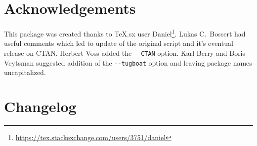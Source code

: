 \documentclass{ltxdoc}
\begin{document}
\section{Acknowledgements}

This package was created thanks to TeX.sx user
Daniel\footnote{\url{https://tex.stackexchange.com/users/3751/daniel}}. Lukas
C.~Bossert had useful comments which led to update of the original script and
it's eventual release on CTAN. Herbert Voss added the \verb|--CTAN| option.
Karl Berry and Boris Veytsman suggested addition of the \verb|--tugboat| option 
and leaving package names uncapitalized.

\newpage
\section{Changelog}
\end{document}
